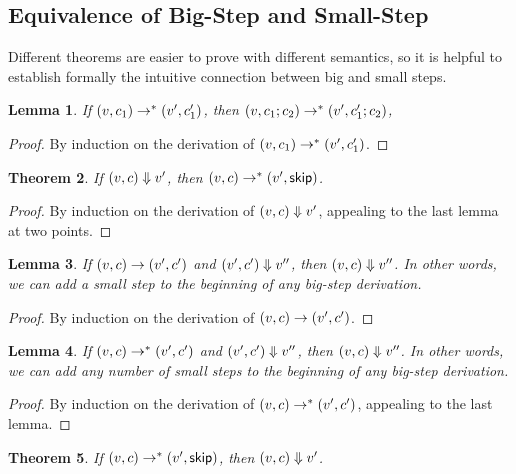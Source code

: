 \documentclass{amsbook}
\newtheorem{theorem}{Theorem}[chapter]
\newtheorem{lemma}[theorem]{Lemma}
\theoremstyle{definition}
\theoremstyle{remark}
\numberwithin{section}{chapter}
\numberwithin{equation}{chapter}
\begin{document}
\subsection{Equivalence of Big-Step and Small-Step}

Different theorems are easier to prove with different semantics, so it is helpful to establish formally the intuitive connection between big and small steps.

\begin{lemma}
  If $(v, c_1) \to^* (v', c'_1)$, then $(v, c_1; c_2) \to^* (v', c'_1; c_2)$,
\end{lemma}

\begin{proof}
  By induction on the derivation of $(v, c_1) \to^* (v', c'_1)$.
\end{proof}

\begin{theorem}
  If $(v, c) \Downarrow v'$, then $(v, c) \to^* (v', \mathsf{skip})$.
\end{theorem}

\begin{proof}
  By induction on the derivation of $(v, c) \Downarrow v'$, appealing to the last lemma at two points.
\end{proof}

\begin{lemma}
  If $(v, c) \to (v', c')$ and $(v', c') \Downarrow v''$, then $(v, c) \Downarrow v''$.  In other words, we can add a small step to the beginning of any big-step derivation.
\end{lemma}

\begin{proof}
  By induction on the derivation of $(v, c) \to (v', c')$.
\end{proof}

\begin{lemma}
  If $(v, c) \to^* (v', c')$ and $(v', c') \Downarrow v''$, then $(v, c) \Downarrow v''$.  In other words, we can add any number of small steps to the beginning of any big-step derivation.
\end{lemma}

\begin{proof}
  By induction on the derivation of $(v, c) \to^* (v', c')$, appealing to the last lemma.
\end{proof}

\begin{theorem}
  If $(v, c) \to^* (v', \mathsf{skip})$, then $(v, c) \Downarrow v'$.
\end{theorem}
\end{document}
